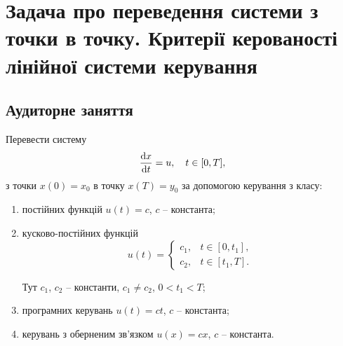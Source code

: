 
\section{Задача про переведення системи з точки в точку. Критерії керованості лінійної системи керування}

\subsection{Аудиторне заняття}

\begin{problem}
	Перевести систему \[ \frac{\mathop{}\!\mathrm{d} x}{\mathop{}\!\mathrm{d} t} = u, \quad t \in [0, T], \] з точки $x (0) = x_0$ в точку $x (T) = y_0$ за допомогою керування з класу:
	\begin{enumerate}
		\item постійних функцій $u (t) = c$, $c$ -- константа;

		\item кусково-постійних функцій \[ u (t) = \begin{cases} c_1, & t \in [0, t_1], \\ c_2, & t \in [t_1, T]. \end{cases} \]

		Тут $c_1$, $c_2$ -- константи, $c_1 \ne c_2$, $0 < t_1 < T$;

		\item програмних керувань $u(t) = c t$, $c$ -- константа;

		\item керувань з оберненим зв'язком $u(x) = c x$, $c$ -- константа.
	\end{enumerate}
\end{problem}

